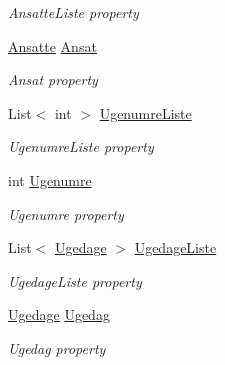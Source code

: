 \begin{DoxyCompactItemize}
\begin{DoxyCompactList}\small\item\em Ansatte\+Liste property \end{DoxyCompactList}\item 
\hyperlink{class__1aarsproeve_1_1_model_1_1_ansatte}{Ansatte} \hyperlink{class__1aarsproeve_1_1_view_model_1_1_vagtplan_view_model_acfc1e3ec69784426fcdecb303c0c1f94}{Ansat}
\begin{DoxyCompactList}\small\item\em Ansat property \end{DoxyCompactList}\item 
List$<$ int $>$ \hyperlink{class__1aarsproeve_1_1_view_model_1_1_vagtplan_view_model_af852f26329ee256810f5fb02f8c5ac1d}{Ugenumre\+Liste}
\begin{DoxyCompactList}\small\item\em Ugenumre\+Liste property \end{DoxyCompactList}\item 
int \hyperlink{class__1aarsproeve_1_1_view_model_1_1_vagtplan_view_model_ab6e58a1f61f376d8c31d27b8a17233af}{Ugenumre}
\begin{DoxyCompactList}\small\item\em Ugenumre property \end{DoxyCompactList}\item 
List$<$ \hyperlink{class__1aarsproeve_1_1_model_1_1_ugedage}{Ugedage} $>$ \hyperlink{class__1aarsproeve_1_1_view_model_1_1_vagtplan_view_model_a288c70ed7f7ad254c50079c4fc33b855}{Ugedage\+Liste}
\begin{DoxyCompactList}\small\item\em Ugedage\+Liste property \end{DoxyCompactList}\item 
\hyperlink{class__1aarsproeve_1_1_model_1_1_ugedage}{Ugedage} \hyperlink{class__1aarsproeve_1_1_view_model_1_1_vagtplan_view_model_ab6066f6ae85c31a626884095e201c989}{Ugedag}
\begin{DoxyCompactList}\small\item\em Ugedag property \end{DoxyCompactList}\item 

\end{DoxyCompactItemize}
